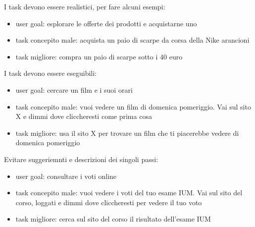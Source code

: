 \documentclass[11pt,a4paper]{book}
\begin{document}
I task devono essere realistici, per fare alcuni esempi:
\begin{itemize}
	\item user goal: esplorare le offerte dei prodotti e acquistarne uno
	\item task concepito male: acquista un paio di scarpe da corsa della Nike arancioni
	\item task migliore: compra un paio di scarpe sotto i 40 euro
\end{itemize}

I task devono essere eseguibili:
\begin{itemize}
	\item user goal: cercare un film e i suoi orari
	\item task concepito male: vuoi vedere un film di domenica pomeriggio. Vai sul sito X e dimmi dove cliccheresti come prima cosa
	\item task migliore: usa il sito X per trovare un film che ti piacerebbe vedere di domenica pomeriggio
\end{itemize}

Evitare suggeriemnti e descrizioni dei singoli passi:
\begin{itemize}
	\item user goal: consultare i voti online
	\item task concepito male: vuoi vedere i voti del tuo esame IUM. Vai sul sito del corso, loggati e dimmi dove cliccheresti per vedere il tuo voto
	\item task migliore: cerca sul sito del corso il risultato dell'esame IUM
\end{itemize}
\end{document}
